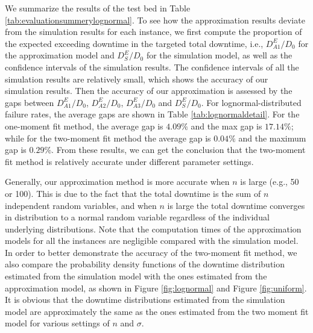 \documentclass[preprint,12pt]{elsarticle}
\begin{document}
We summarize the results of the test bed in Table \ref{tab:evaluationsummerylognormal}. To see how the approximation results deviate from the simulation results for each instance, we first compute the proportion of the expected exceeding downtime in the targeted total downtime, i.e., $D_{A1}^{E}/D_0$ for the approximation model and $D_{S}^{E}/D_0$ for the simulation model, as well as the confidence intervals of the simulation results. The confidence intervals of all the simulation results are relatively small, which shows the accuracy of our simulation results. Then the accuracy of our approximation is assessed by the gaps between $D_{A1}^{E}/D_0$, $D_{A2}^{E}/D_0$, $D_{A3}^{E}/D_0$ and $D_{S}^{E}/D_0$. For lognormal-distributed failure rates, the average gaps are shown in Table \ref{tab:lognormaldetail}. For the one-moment fit method, the average gap is $4.09\%$ and the max gap is $17.14\%$; while for the two-moment fit method the average gap is $0.04\%$ and the maximum gap is $0.29\%$. From these results, we can get the conclusion that the two-moment fit method is relatively accurate under different parameter settings. %


Generally, our approximation method is more accurate when $n$ is large (e.g., 50 or 100). This is due to the fact that the total downtime is the sum of $n$ independent random variables, and when $n$ is large the total downtime converges in distribution to a normal random variable regardless of the individual underlying distributions. Note that the computation times of the approximation models for all the instances are negligible compared with the simulation model. In order to better demonstrate the accuracy of the two-moment fit method, we also compare the probability density functions of the downtime distribution estimated from the simulation model with the ones estimated from the approximation model, as shown in Figure \ref{fig:lognormal} and Figure \ref{fig:uniform}. It is obvious that the downtime distributions estimated from the simulation model are approximately the same as the ones estimated from the two moment fit model for various settings of $n$ and $\sigma$.
\small
\end{document}
